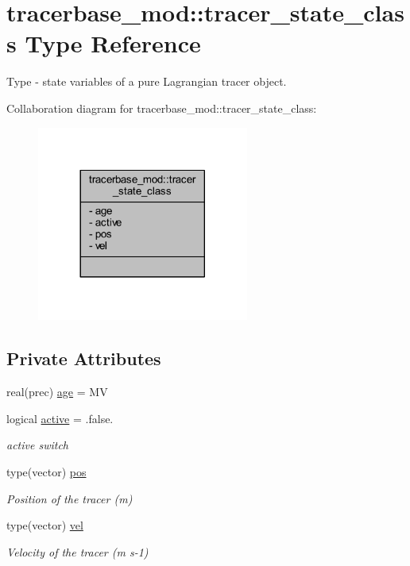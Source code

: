 \hypertarget{structtracerbase__mod_1_1tracer__state__class}{}\section{tracerbase\+\_\+mod\+:\+:tracer\+\_\+state\+\_\+class Type Reference}
\label{structtracerbase__mod_1_1tracer__state__class}


Type -\/ state variables of a pure Lagrangian tracer object.  




Collaboration diagram for tracerbase\+\_\+mod\+:\+:tracer\+\_\+state\+\_\+class\+:\nopagebreak
\begin{figure}[H]
\begin{center}
\leavevmode
\includegraphics[width=197pt]{structtracerbase__mod_1_1tracer__state__class__coll__graph}
\end{center}
\end{figure}
\subsection*{Private Attributes}
\begin{DoxyCompactItemize}
\item 
real(prec) \mbox{\hyperlink{structtracerbase__mod_1_1tracer__state__class_aabf14569a79276d6cdd0f0a537cfb046}{age}} = MV
\item 
logical \mbox{\hyperlink{structtracerbase__mod_1_1tracer__state__class_a40841af58b7434716bc8d87bf1b3b694}{active}} = .false.
\begin{DoxyCompactList}\small\item\em active switch \end{DoxyCompactList}\item 
type(vector) \mbox{\hyperlink{structtracerbase__mod_1_1tracer__state__class_a184b3ecbe519a6cc7468fa3060131ce0}{pos}}
\begin{DoxyCompactList}\small\item\em Position of the tracer (m) \end{DoxyCompactList}\item 
type(vector) \mbox{\hyperlink{structtracerbase__mod_1_1tracer__state__class_ae94928588f703077bae9de12c8e9d14b}{vel}}
\begin{DoxyCompactList}\small\item\em Velocity of the tracer (m s-\/1) \end{DoxyCompactList}\end{DoxyCompactItemize}


